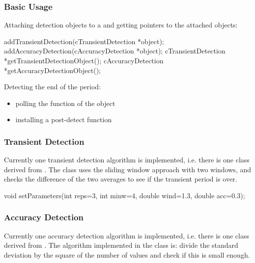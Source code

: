 \subsubsection{Basic Usage}

%
%

Attaching detection objects to a  and getting pointers
to the attached objects:

\begin{cpp}
addTransientDetection(cTransientDetection *object);
addAccuracyDetection(cAccuracyDetection *object);
cTransientDetection *getTransientDetectionObject();
cAccuracyDetection *getAccuracyDetectionObject();
\end{cpp}


Detecting the end of the period:
\begin{itemize}
\item{polling the  function of the object}
\item{installing a post-detect function}
\end{itemize}


\subsubsection{Transient Detection}


Currently one transient detection algorithm
is implemented, i.e.  there is one class derived from
. The  class
uses the sliding window approach with two windows, and checks the
difference of the two averages to see if the transient period is over.

\begin{cpp}
void setParameters(int reps=3,
                   int minw=4,
                   double wind=1.3,
                   double acc=0.3);
\end{cpp}

\subsubsection{Accuracy Detection}


Currently one accuracy detection algorithm
is implemented, i.e.  there is one class derived from
. The algorithm implemented in the
 class is: divide the standard deviation by the
square of the number of values and check if this is small enough.

